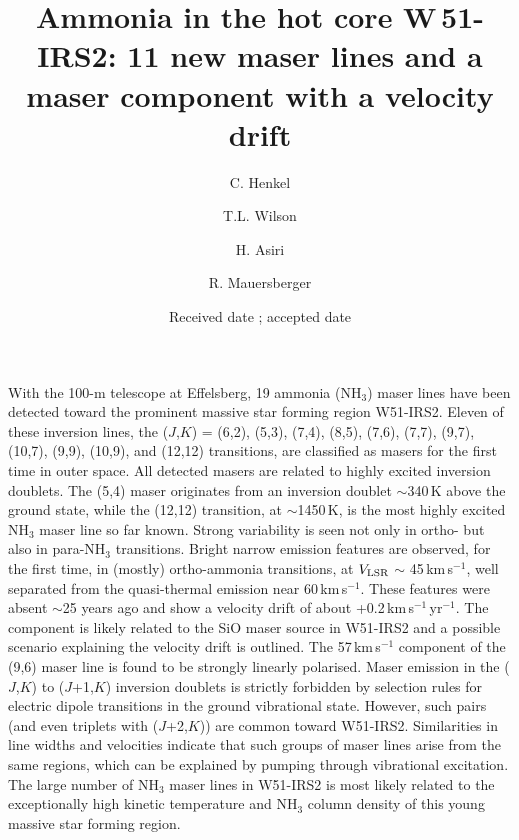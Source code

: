 \documentclass[oldversion]{aa}
\begin{document}
\title{Ammonia in the hot core W\,51-IRS2:
       11 new maser lines and a maser component with a velocity drift}

\author{C. Henkel 
        \and 
        T.L. Wilson 
        \and 
        H. Asiri
        \and 
        R. Mauersberger}


 
\date{Received date ; accepted date}
 
\abstract
{With the 100-m telescope at Effelsberg, 19 ammonia (NH$_3$) maser 
lines have been detected toward the prominent massive star forming region 
W51-IRS2. Eleven of these inversion lines, the ($J$,$K$) = (6,2), (5,3), 
(7,4), (8,5), (7,6), (7,7), (9,7), (10,7), (9,9), (10,9), and 
(12,12) transitions, are classified as masers for the first time in 
outer space. All detected masers are related to highly excited 
inversion doublets. The (5,4) maser originates from an inversion doublet
$\sim$340\,K above the ground state, while the (12,12) transition,
at $\sim$1450\,K, is the most highly excited NH$_3$ maser line so far 
known. Strong variability is seen not only in ortho- but also in 
para-NH$_3$ transitions. Bright narrow emission features are observed, 
for the first time, in (mostly) ortho-ammonia transitions, at 
$V_{\rm LSR}$ $\sim$ 45\,km\,s$^{-1}$, well separated from the 
quasi-thermal emission near 60\,km\,s$^{-1}$. These features were 
absent $\sim$25 years ago and show a velocity drift of about
+0.2\,km\,s$^{-1}$\,yr$^{-1}$. The component is likely related to 
the SiO maser source in W51-IRS2 and a possible scenario explaining 
the velocity drift is outlined. The 57\,km\,s$^{-1}$ component of 
the (9,6) maser line is found to be strongly linearly polarised. 
Maser emission in the ($J$,$K$) to ($J$+1,$K$) inversion 
doublets is strictly forbidden by selection rules for electric 
dipole transitions in the ground vibrational state. However, 
such pairs (and even triplets with ($J$+2,$K$)) are common 
toward W51-IRS2. Similarities in line widths and velocities 
indicate that such groups of maser lines arise from the same 
regions, which can be explained by pumping through vibrational 
excitation. The large number of NH$_3$ maser lines in W51-IRS2 is 
most likely related to the exceptionally high kinetic temperature 
and NH$_3$ column density of this young massive star forming region.}
\end{document}

